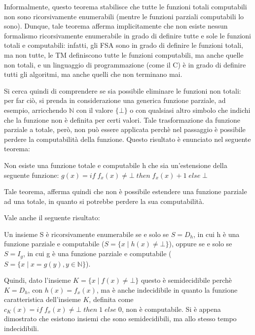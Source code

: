   Informalmente, questo teorema stabilisce che tutte le funzioni totali computabili non sono ricorsivamente enumerabili (mentre le funzioni parziali computabili lo sono). Dunque, tale teorema afferma implicitamente che non esiste nessun formalismo ricorsivamente enumerabile in grado di definire tutte e sole le funzioni totali e computabili: infatti, gli FSA sono in grado di definire le funzioni totali, ma non tutte, le TM definiscono tutte le funzioni computabili, ma anche quelle non totali, e un linguaggio di programmazione (come il C) è in grado di definire tutti gli algoritmi, ma anche quelli che non terminano mai. 
  
  Si cerca quindi di comprendere se sia possibile eliminare le funzioni non totali: per far ciò, si prenda in considerazione una generica funzione parziale, ad esempio, arricchendo \(\mathbb{N}\) con il valore \(\{\bot\}\) o con qualsiasi altro simbolo che indichi che la funzione non è definita per certi valori. Tale trasformazione da funzione parziale a totale, però, non può essere applicata perchè nel passaggio è possibile perdere la computabilità della funzione. Questo risultato è enunciato nel seguente teorema:
  
  \begin{theorem}
    Non esiste una funzione totale e computabile h che sia un'estensione della seguente funzione:
    \(g(x)=if\;f_x(x)\neq\bot\;then\;f_x(x)+1\;else\;\bot\)
  \end{theorem}

  Tale teorema, afferma quindi che non è possibile estendere una funzione parziale ad una totale, in quanto si potrebbe perdere la sua computabilità.

  Vale anche il seguente risultato:
  \begin{theorem}
    Un insieme S è ricorsivamente enumerabile se e solo se \(S=D_h\), in cui h è una funzione parziale e computabile (\(S=\{x\;|\;h(x)\neq \bot\}\)), oppure se e solo se \(S=I_g\), in cui g è una funzione parziale e computabile (\(S=\{x\;|\;x=g(y), y\in \mathbb{N}\}\)).
  \end{theorem}

  Quindi, dato l'insieme \(K=\{x\;|\;f(x) \neq \bot\}\) questo è semidecidibile perchè \(K=D_h\), con \(h(x)=f_x(x)\), ma è anche indecidibile in quanto la funzione caratteristica dell'insieme \(K\), definita come \(c_K(x)=if\;f_x(x)\neq \bot\;then\;1\;else\;0\), non è computabile. Si è appena dimostrato che esistono insiemi che sono semidecidibili, ma allo stesso tempo indecidibili.

